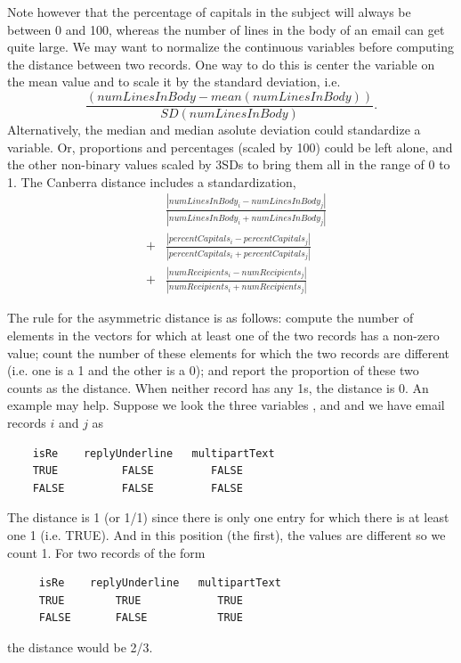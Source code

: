 Note however that the percentage of capitals in the subject will always
be between 0 and 100, whereas the number of lines in the body of an
email can get quite large.
We may want to normalize the continuous variables before
computing the distance between two records.
One way to do this is center the variable on
the mean value and to scale it by the standard deviation,
i.e.
$$
\frac{(numLinesInBody - mean(numLinesInBody))}
{SD(numLinesInBody)} .$$
Alternatively, the median and median asolute deviation could
standardize a variable.
Or, proportions and percentages (scaled by 100) could be left
alone, and the other non-binary values scaled by 3SDs to bring
them all in the range of 0 to 1. 
The Canberra distance includes a standardization,
\begin{eqnarray*}
 &~& \frac {|numLinesInBody_i - numLinesInBody_j|} 
  {|numLinesInBody_i + numLinesInBody_j|} \\
    &+& \frac {|percentCapitals_i - percentCapitals_j|} 
            {|percentCapitals_i + percentCapitals_j|} \\
      &+& \frac {|numRecipients_i - numRecipients_j|} 
            {|numRecipients_i + numRecipients_j|}
\end{eqnarray*}

The rule for the asymmetric distance is as follows:
compute the number of elements in the vectors for which at least one
of the two records has a non-zero value; count the number of these
elements for which the two records are different (i.e. one is a 1
and the other is a 0); and report the proportion of these two
counts as the distance.  
When neither record has any 1s, the distance is 0.
An example may help. Suppose we look the three variables
,  and 
and we have email records $i$ and $j$ as

\begin{verbatim}
    isRe    replyUnderline   multipartText
    TRUE          FALSE         FALSE
    FALSE         FALSE         FALSE
\end{verbatim}
The distance is 1 (or 1/1) since there is only one
entry for which there is at least one 1 (i.e. TRUE).
And in this position (the first), the values are different so we count 1.
For two records of the form
\begin{verbatim}
     isRe    replyUnderline   multipartText
     TRUE        TRUE            TRUE
     FALSE       FALSE           TRUE
\end{verbatim}
the distance would be 2/3.

